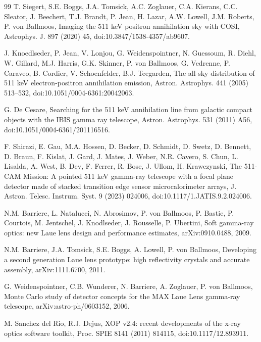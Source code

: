 \documentclass[11pt]{article}
\begin{document}
\begin{thebibliography}{99}
T. Siegert, S.E. Boggs, J.A. Tomsick, A.C. Zoglauer, C.A. Kierans, C.C. Sleator, J. Beechert, T.J. Brandt, P. Jean, H. Lazar, A.W. Lowell, J.M. Roberts, P. von Ballmoos, Imaging the 511 keV positron annihilation sky with COSI, Astrophys. J. 897 (2020) 45, doi:10.3847/1538-4357/ab9607.

J. Knoedlseder, P. Jean, V. Lonjou, G. Weidenspointner, N. Guessoum, R. Diehl, W. Gillard, M.J. Harris, G.K. Skinner, P. von Ballmoos, G. Vedrenne, P. Caraveo, B. Cordier, V. Schoenfelder, B.J. Teegarden, The all-sky distribution of 511 keV electron-positron annihilation emission, Astron. Astrophys. 441 (2005) 513--532, doi:10.1051/0004-6361:20042063.

G. De Cesare, Searching for the 511 keV annihilation line from galactic compact objects with the IBIS gamma ray telescope, Astron. Astrophys. 531 (2011) A56, doi:10.1051/0004-6361/201116516.

F. Shirazi, E. Gau, M.A. Hossen, D. Becker, D. Schmidt, D. Swetz, D. Bennett, D. Braun, F. Kislat, J. Gard, J. Mates, J. Weber, N.R. Cavero, S. Chun, L. Lisalda, A. West, B. Dev, F. Ferrer, R. Bose, J. Ullom, H. Krawczynski, The 511-CAM Mission: A pointed 511 keV gamma-ray telescope with a focal plane detector made of stacked transition edge sensor microcalorimeter arrays, J. Astron. Telesc. Instrum. Syst. 9 (2023) 024006, doi:10.1117/1.JATIS.9.2.024006.

N.M. Barriere, L. Natalucci, N. Abrosimov, P. von Ballmoos, P. Bastie, P. Courtois, M. Jentschel, J. Knodlseder, J. Rousselle, P. Ubertini, Soft gamma-ray optics: new Laue lens design and performance estimates, arXiv:0910.0488, 2009.

N.M. Barriere, J.A. Tomsick, S.E. Boggs, A. Lowell, P. von Ballmoos, Developing a second generation Laue lens prototype: high reflectivity crystals and accurate assembly, arXiv:1111.6700, 2011.

G. Weidenspointner, C.B. Wunderer, N. Barriere, A. Zoglauer, P. von Ballmoos, Monte Carlo study of detector concepts for the MAX Laue Lens gamma-ray telescope, arXiv:astro-ph/0603152, 2006.

M. Sanchez del Rio, R.J. Dejus, XOP v2.4: recent developments of the x-ray optics software toolkit, Proc. SPIE 8141 (2011) 814115, doi:10.1117/12.893911.


\end{thebibliography}
\end{document}
